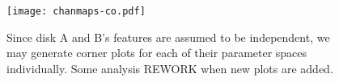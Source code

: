 

\begin{figure}[htp]
  \hspace*{\fill}%
  \texttt{[image: chanmaps-co.pdf]}\hfill%
  \hspace*{\fill}%
  \caption{Since disk A and B's features are assumed to be independent, we may generate corner plots for each of their parameter spaces individually. Some analysis REWORK when new plots are added.}
  \label{fig:co_chanmaps}
\end{figure}





